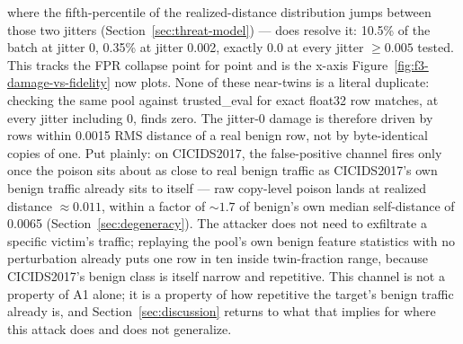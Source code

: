 where the fifth-percentile of the realized-distance distribution jumps between those two
jitters (Section~\ref{sec:threat-model}) — does resolve it: 10.5\% of the batch at jitter 0,
0.35\% at jitter 0.002, exactly 0.0 at every jitter $\ge0.005$ tested. This tracks the FPR
collapse point for point and is the x-axis Figure~\ref{fig:f3-damage-vs-fidelity} now plots.
None of these near-twins is a literal duplicate: checking the same pool against trusted\_eval for
exact float32 row matches, at every jitter including 0, finds zero. The jitter-0 damage is
therefore driven by rows within 0.0015 RMS distance of a real benign row, not by byte-identical
copies of one.
Put plainly: on CICIDS2017, the false-positive channel fires only once the poison sits about as
close to real benign traffic as CICIDS2017's own benign traffic already sits to itself — raw
copy-level poison lands at realized distance $\approx0.011$, within a factor of $\sim1.7$ of
benign's own median self-distance of 0.0065 (Section~\ref{sec:degeneracy}). The attacker does not
need to exfiltrate a specific victim's traffic; replaying the pool's own benign feature
statistics with no perturbation already puts one row in ten inside twin-fraction range, because
CICIDS2017's benign class is itself narrow and repetitive. This channel is not a property of A1
alone; it is a property of how repetitive the target's benign traffic already is, and
Section~\ref{sec:discussion} returns to what that implies for where this attack does and does
not generalize.

